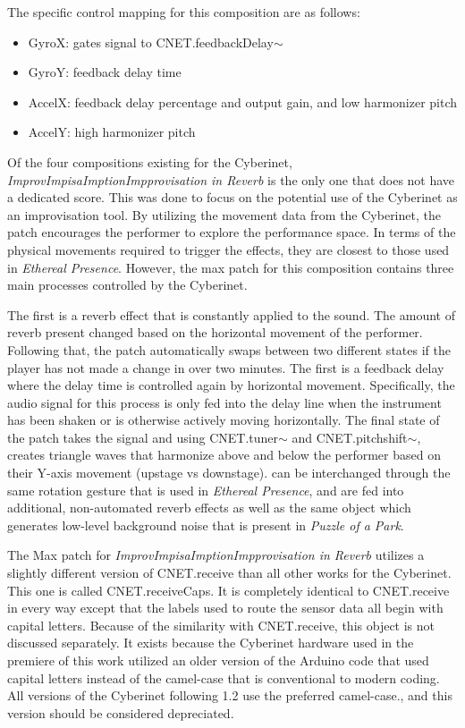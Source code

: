 The specific control mapping for this composition are as follows: 

\begin{itemize}
    \item GyroX: gates signal to CNET.feedbackDelay$\sim$
    \item GyroY: feedback delay time
    \item AccelX: feedback delay percentage and output gain, and low harmonizer pitch
    \item AccelY: high harmonizer pitch
\end{itemize}

Of the four compositions existing for the Cyberinet, \textit{ImprovImpisaImptionImpprovisation in Reverb} is the only one that does not have a dedicated score. This was done to focus on the potential use of the Cyberinet as an improvisation tool. By utilizing the movement data from the Cyberinet, the patch encourages the performer to explore the performance space. In terms of the physical movements required to trigger the effects, they are closest to those used in \textit{Ethereal Presence}. However, the max patch for this composition contains three main processes controlled by the Cyberinet. 

The first is a reverb effect that is constantly applied to the sound. The amount of reverb present changed based on the horizontal movement of the performer. Following that, the patch automatically swaps between two different states if the player has not made a change in over two minutes. The first is a feedback delay where the delay time is controlled again by horizontal movement. Specifically, the audio signal for this process is only fed into the delay line when the instrument has been shaken or is otherwise actively moving horizontally. The final state of the patch takes the signal and using CNET.tuner$\sim$ and CNET.pitchshift$\sim$, creates triangle waves that harmonize above and below the performer based on their Y-axis movement (upstage vs downstage). can be interchanged through the same rotation gesture that is used in \textit{Ethereal Presence}, and are fed into additional, non-automated reverb effects as well as the same object which generates low-level background noise that is present in \textit{Puzzle of a Park}.

The Max patch for \textit{ImprovImpisaImptionImpprovisation in Reverb} utilizes a slightly different version of CNET.receive than all other works for the Cyberinet. This one is called CNET.receiveCaps. It is completely identical to CNET.receive in every way except that the labels used to route the sensor data all begin with capital letters. Because of the similarity with CNET.receive, this object is not discussed separately. It exists because the Cyberinet hardware used in the premiere of this work utilized an older version of the Arduino code that used capital letters instead of the camel-case that is conventional to modern coding. All versions of the Cyberinet following 1.2 use the preferred camel-case., and this version should be considered depreciated.

